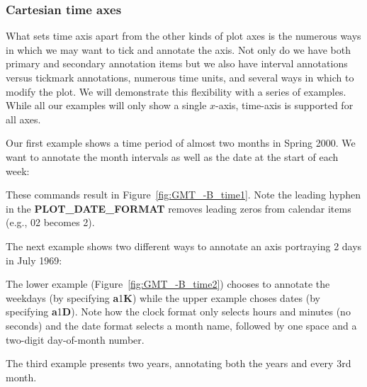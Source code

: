 
\subsubsection{Cartesian time axes}

What sets time axis apart from the other kinds of plot axes is the numerous ways in which we
may want to tick and annotate the axis.  Not only do we have both primary and secondary annotation
items but we also have interval annotations versus tickmark annotations, numerous time units,
and several ways in which to modify the plot.  We will demonstrate this flexibility with a
series of examples.  While all our examples will only show a single $x$-axis, time-axis is supported for all axes.

Our first example shows a time period of almost two months in Spring 2000.  We want to annotate the month
intervals as well as the date at the start of each week:


These commands result in Figure~\ref{fig:GMT_-B_time1}.  Note the leading hyphen in the \textbf{PLOT\_DATE\_FORMAT}
removes leading zeros from calendar items (e.g., 02 becomes 2).

The next example shows two different ways to annotate an axis portraying 2 days in July 1969:


The lower example (Figure~\ref{fig:GMT_-B_time2}) chooses to annotate the weekdays (by specifying
\textbf{a}1\textbf{K}) while the upper
example choses dates (by specifying \textbf{a}1\textbf{D}).  Note how the clock format only selects hours and minutes (no seconds) and
the date format selects a month name, followed by one space and a two-digit day-of-month number.


The third example presents two years, annotating both the years and every 3rd month.

